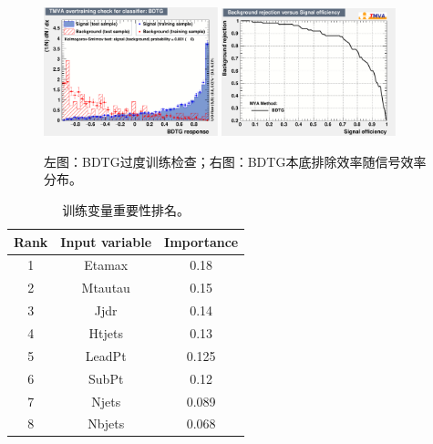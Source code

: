 \begin{figure}[htbp]
\centering
\begin{center}
  \includegraphics[width=0.45\textwidth, keepaspectratio]{fig/OneLepTwoTaus/overtrain_BDTG.pdf}
  \includegraphics[width=0.45\textwidth, keepaspectratio]{fig/OneLepTwoTaus/rejBvsS.pdf}
\end{center}
\caption{左图：BDTG过度训练检查；右图：BDTG本底排除效率随信号效率分布。}
\label{Fig:1l2tau.bdt}
\end{figure}

\begin{table}[htbp]
\begin{center}
\begin{tabular}{c|c|c}\hline
Rank & Input variable  & Importance \\ \hline
1 & Etamax & 0.18\\
2 & Mtautau & 0.15 \\
3 & Jjdr & 0.14 \\
4 & Htjets & 0.13 \\
5 & LeadPt & 0.125 \\
6 & SubPt & 0.12 \\
7 & Njets & 0.089 \\
8 & Nbjets & 0.068 \\ \hline
\end{tabular}
\caption{训练变量重要性排名。}
\label{Tab:1l2tau.bdtrank}
\end{center}
\end{table}

